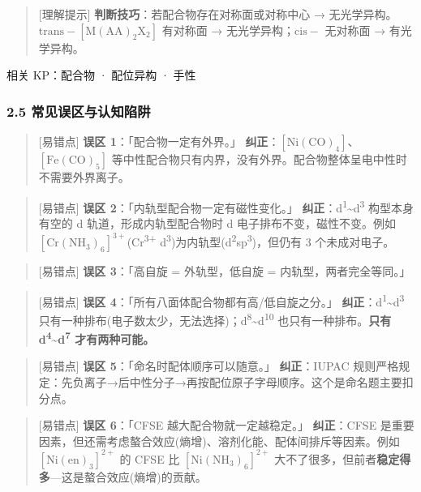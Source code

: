 \begin{quote}
{[}理解提示{]} \textbf{判断技巧}：若配合物存在对称面或对称中心 → 无光学异构。\(\mathrm{trans-[M(AA)_2X_2]}\) 有对称面 → 无光学异构；\(\mathrm{cis-}\) 无对称面 → 有光学异构。
\end{quote}

相关 KP：配合物 · 配位异构 · 手性

\subsubsection{2.5 常见误区与认知陷阱}\label{ux5e38ux89c1ux8befux533aux4e0eux8ba4ux77e5ux9677ux9631}

\begin{quote}
{[}易错点{]} \textbf{误区 1}：「配合物一定有外界。」
\textbf{纠正}：\(\mathrm{[Ni(CO)_4]}\)、\(\mathrm{[Fe(CO)_5]}\) 等中性配合物只有内界，没有外界。配合物整体呈电中性时不需要外界离子。
\end{quote}

\begin{quote}
{[}易错点{]} \textbf{误区 2}：「内轨型配合物一定有磁性变化。」
\textbf{纠正}：d\textsuperscript{1}\textasciitilde d\textsuperscript{3} 构型本身有空的 d 轨道，形成内轨型配合物时 d 电子排布不变，磁性不变。例如 \([\mathrm{Cr(NH_3)_6}]^{3+}\)(Cr\textsuperscript{3+} d\textsuperscript{3})为内轨型(d\textsuperscript{2}sp\textsuperscript{3})，但仍有 3 个未成对电子。
\end{quote}

\begin{quote}
{[}易错点{]} \textbf{误区 3}：「高自旋 = 外轨型，低自旋 = 内轨型，两者完全等同。」
\end{quote}

\begin{quote}
{[}易错点{]} \textbf{误区 4}：「所有八面体配合物都有高/低自旋之分。」
\textbf{纠正}：d\textsuperscript{1}\textasciitilde d\textsuperscript{3} 只有一种排布(电子数太少，无法选择)；d\textsuperscript{8}\textasciitilde d\textsuperscript{10} 也只有一种排布。\textbf{只有 d\textsuperscript{4}\textasciitilde d\textsuperscript{7} 才有两种可能。}
\end{quote}

\begin{quote}
{[}易错点{]} \textbf{误区 5}：「命名时配体顺序可以随意。」
\textbf{纠正}：IUPAC 规则严格规定：先负离子→后中性分子→再按配位原子字母顺序。这个是命名题主要扣分点。
\end{quote}

\begin{quote}
{[}易错点{]} \textbf{误区 6}：「CFSE 越大配合物就一定越稳定。」
\textbf{纠正}：CFSE 是重要因素，但还需考虑螯合效应(熵增)、溶剂化能、配体间排斥等因素。例如 \([\mathrm{Ni(en)_3}]^{2+}\) 的 CFSE 比 \([\mathrm{Ni(NH_3)_6}]^{2+}\) 大不了很多，但前者\textbf{稳定得多}---这是螯合效应(熵增)的贡献。
\end{quote}

